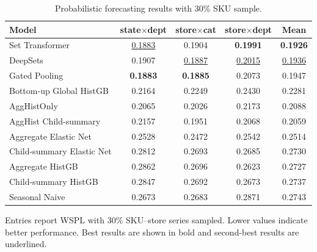 \documentclass[12pt]{article}
\begin{document}
\begin{table}[H]
  \centering
  \caption{Probabilistic forecasting results with 30\% SKU sample.}
  \label{tab:appendix_quantile_30pct}
  \begin{threeparttable}
    \begin{tabular}{lcccc}
      \toprule
      Model                     & state$\times$dept  & store$\times$cat   & store$\times$dept  & Mean               \\
      \midrule
      Set Transformer                & \underline{0.1883} & 0.1904             & \textbf{0.1991}    & \textbf{0.1926}    \\
      DeepSets                       & 0.1907             & \underline{0.1887} & \underline{0.2015} & \underline{0.1936} \\
      Gated Pooling                  & \textbf{0.1883}    & \textbf{0.1885}    & 0.2073             & 0.1947             \\
      Bottom-up Global HistGB        & 0.2164             & 0.2249             & 0.2430             & 0.2281             \\
      AggHistOnly                    & 0.2065             & 0.2026             & 0.2173             & 0.2088             \\
      AggHist Child-summary          & 0.2157             & 0.1951             & 0.2068             & 0.2059             \\
      Aggregate Elastic Net          & 0.2528             & 0.2472             & 0.2542             & 0.2514             \\
      Child-summary Elastic Net      & 0.2812             & 0.2693             & 0.2685             & 0.2730             \\
      Aggregate HistGB               & 0.2862             & 0.2696             & 0.2623             & 0.2727             \\
      Child-summary HistGB           & 0.2847             & 0.2692             & 0.2673             & 0.2737             \\
      Seasonal Naive                 & 0.2673             & 0.2683             & 0.2871             & 0.2743             \\
      \bottomrule
    \end{tabular}
    \begin{tablenotes}
      \footnotesize \item Entries report WSPL with 30\% SKU--store series sampled. Lower values indicate better performance. Best results are shown in bold and second-best results are underlined.
    \end{tablenotes}
  \end{threeparttable}
\end{table}
\end{document}
